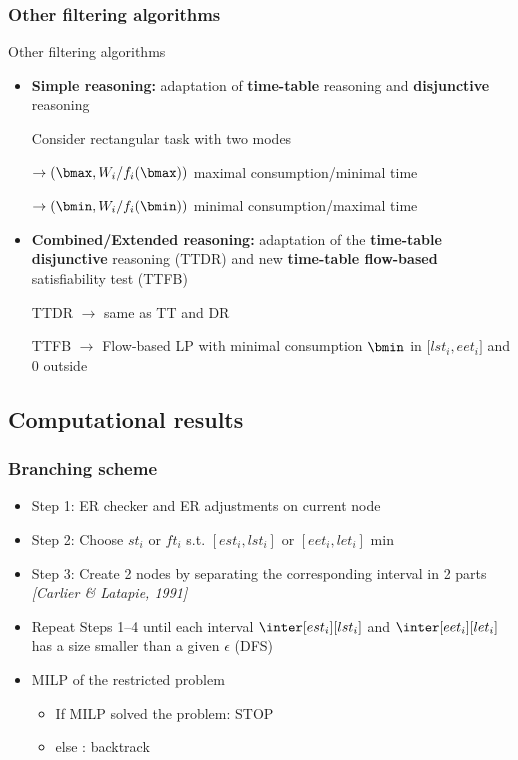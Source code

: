 \subsubsection{Other filtering algorithms}

\begin{frame}{Other filtering algorithms}
  \vfill
  \begin{itemize}
  \item {\bf \color{blue!80!black!80} Simple reasoning: } adaptation of
    {\bf time-table} reasoning and {\bf disjunctive} reasoning
    \vfill
    {\color{gray!80!black!80}{\it Idea: } Consider rectangular task with two modes

      $\rightarrow (\bmax, W_i/f_i(\bmax))$ maximal consumption/minimal time

      $\rightarrow (\bmin, W_i/f_i(\bmin))$ minimal consumption/maximal
      time}
    \vfill
    \pause
  \item {\bf \color{blue!80!black!80} Combined/Extended reasoning: }
    adaptation of the {\bf time-table disjunctive} reasoning (TTDR) and
    new {\bf time-table flow-based} satisfiability test (TTFB)
    \vfill
    {\color{gray!80!black!80}{\it Idea: } TTDR $\rightarrow$ same as TT and DR
      
      TTFB $\rightarrow$ Flow-based LP with minimal consumption $\bmin$ in
      ${[}lst_i ,eet_i{]}$ and $0$ outside}
  \end{itemize}
\end{frame}


\subsection{Computational results}

\begin{frame}
  \frametitle{Branching scheme }
  \begin{itemize}
    \vfill
  \item Step 1: ER checker and ER adjustments on current node 
    \vfill    
  \item Step 2: Choose $st_i$ or $ft_i$ s.t. $[est_i,lst_i]$ or
    $[eet_i,let_i]$ min
    \vfill
  \item Step 3: Create 2 nodes by separating the corresponding
    interval in 2 parts {\small \it \color{gray!50!black!50} [Carlier \& Latapie, 1991]}
    \vfill
  \item{\color{red!80!black!80} Repeat Steps 1--4 until each interval $\inter[est_i][lst_i]$ and $\inter[eet_i][let_i]$ has a size smaller than a given $\epsilon$ (DFS)}
    \vfill
  \item MILP of the restricted problem
    \begin{itemize}
    \item If MILP solved the problem: STOP
    \item else : backtrack
    \end{itemize}
  \end{itemize}
  \vfill
\end{frame}


